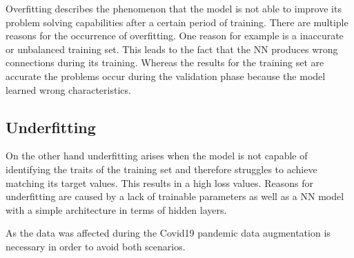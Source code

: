 Overfitting describes the phenomenon that the model is not able to improve its problem solving capabilities after a certain period of training. There are multiple reasons for the occurrence of overfitting. One reason for example is a inaccurate or unbalanced training set. This leads to the fact that the NN produces wrong connections during its training.  Whereas the results for the training set are accurate the problems  occur during the validation phase because the model learned wrong characteristics. \cite{fitting} 
\subsection{Underfitting}
On the other hand underfitting arises when the model is not capable of identifying the traits of the training set and therefore struggles to achieve matching its target values. This results in a high loss values. Reasons for underfitting are caused by a lack of trainable parameters as well as a NN model with a simple architecture in terms of hidden layers. \cite{fitting} 

As the data was affected during the Covid19 pandemic data augmentation is necessary in order to avoid both scenarios.

